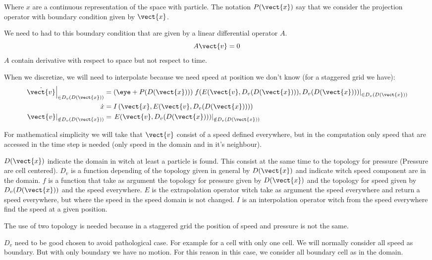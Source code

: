 Where $x$ are a continuous representation of the space with particle.
The notation $P(\vect{x})$ say that we consider the projection operator with boundary condition given by $\vect{x}$.

We need to had to this boundary condition that are given by a linear differential operator $A$.
\begin{equation}
	A\vect{v}=0
\end{equation}
$A$ contain derivative with respect to space but not respect to time.

When we discretize, we will need to interpolate because we need speed at position we don't know (for a staggered grid we have):
\begin{align*}
	\left.\dot{\vect{v}}\right|_{\in D_{v}(D(\vect{x}))}&=\left(\eye+P(D(\vect{x}))\right)\left.f(E(\vect{v},D_v(D(\vect{x}))),D_{v}(D(\vect{x})))\right|_{\in D_{v}(D(\vect{x}))}\\
	\dot{x}&=I\left(\vect{x},E(\vect{v},D_v(D(\vect{x})))\right)\\
	\left.\vect{v}\right|_{\notin D_{v}(D(\vect{x}))}&=\left.E(\vect{v},D_v(D(\vect{x})))\right|_{\notin D_{v}(D(\vect{x}))}
\end{align*}

For mathematical simplicity we will take that $\vect{v}$ consist of a speed defined everywhere, 
but in the computation only speed that are accessed in the time step is needed (only speed in the domain and in it's neighbour).

$D(\vect{x})$ indicate the domain in witch at least a particle is found. This consist at the same time to the topology for pressure (Pressure are cell centered).
$D_{v}$ is a function depending of the topology given in general by $D(\vect{x})$ and indicate witch speed component are in the domain.
$f$ is a function that take as argument the topology for pressure given by $D(\vect{x})$ and the topology for speed given by $D_v(D(\vect{x}))$ and the speed everywhere.
$E$ is the extrapolation operator witch take as argument the speed everywhere and return a speed everywhere,
but where the speed in the speed domain is not changed.
$I$ is an interpolation operator witch from the speed everywhere find the speed at a given position.

The use of two topology is needed because in a staggered grid the position of speed and pressure is not the same.

$D_{v}$ need to be good chosen to avoid pathological case.
For example for a cell with only one cell. We will normally consider all speed as boundary. But with only boundary we have no motion.
For this reason in this case, we consider all boundary cell as in the domain.

